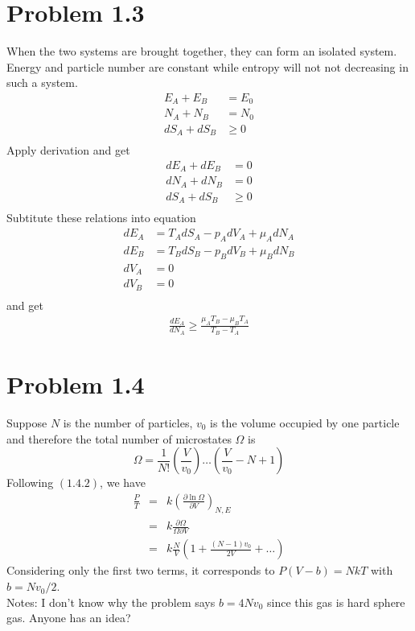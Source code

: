 \documentclass{article}
\begin{document}
\section*{Problem 1.3}
When the two systems are brought together, they can form an isolated system. Energy and particle number are constant while entropy will not not decreasing in such a system.\\
\begin{align}
E_A+E_B&=E_0\\
N_A+N_B&=N_0\\
dS_A+dS_B&\geq0\\
\end{align}
Apply derivation and get
\begin{align}
dE_A+dE_B&=0\\
dN_A+dN_B&=0\\
dS_A+dS_B&\geq0\\
\end{align}
Subtitute these relations into equation
\begin{align}
dE_A&=T_AdS_A-p_AdV_A+\mu_A dN_A\\
dE_B&=T_BdS_B-p_BdV_B+\mu_B dN_B\\
dV_A&=0\\
dV_B&=0\\
\end{align}
and get
\begin{align}
\frac{dE_A}{dN_A}\geq\frac{\mu_A T_B-\mu_B T_A}{T_B-T_A}
\end{align}

\section*{Problem 1.4}
Suppose $N$ is the number of particles, $v_{0}$ is the volume occupied by one particle and therefore the total number of microstates $\Omega$ is
\begin{equation}
\Omega = \frac{1}{N!}(\frac{V}{v_{0}}) \dots (\frac{V}{v_{0}}-N+1)
\end{equation}
Following $(1.4.2)$, we have
\begin{eqnarray}
\frac{P}{T} &=& k \left(\frac{\partial \ln \Omega}{\partial V}\right)_{N,E} \\
&=& k \frac{\partial \Omega}{\Omega \partial V} \\
&=& k \frac{N}{V} \left(1+ \frac{(N-1)v_{0}}{2V} + \dots \right)
\end{eqnarray}
Considering only the first two terms, it corresponds to $P(V-b) = NkT$ with $b=N v_{0}/2$. \\
Notes: I don't know why the problem says $b=4N v_{0}$ since this gas is hard sphere gas. Anyone has an idea?
\end{document}
